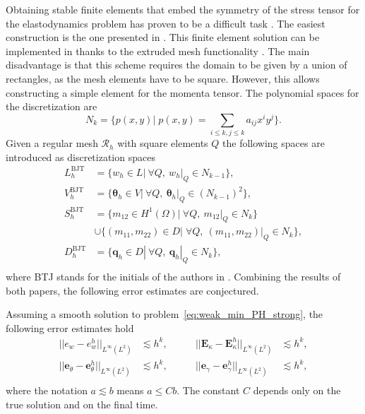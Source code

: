 Obtaining stable finite elements that embed the symmetry of the stress tensor for the elastodynamics problem has proven to be a difficult task \cite{arnold2002mixed}. The easiest construction is the one presented in \cite{becache2001elas}. This finite element solution can be implemented in {} \cite{rathgeber2017firedrake} thanks to the extruded mesh functionality \cite{mcrae2016}.  The main disadvantage is that this scheme requires the domain to be given by a union of rectangles, as the mesh elements have to be square. However, this allows constructing a simple element for the momenta tensor. The polynomial spaces for the discretization are
\[
N_{k} = \{p(x, y)| \; p(x, y) = \sum_{i\le k, j\le k} a_{ij} x^i y^j  \}.
\]
Given a regular mesh $\mathcal{R}_h$ with square elements $Q$ the following spaces are introduced as discretization spaces
\begin{equation}
\label{eq:BTJ}
\begin{aligned}
L_h^{\text{BJT}} &= \{w_h \in L | \ \forall Q, \ w_h|_{Q} \in N_{k-1} \}, \\
V_h^{\text{BJT}} &= \{\bm{\theta}_h \in V | \ \forall Q,\ \bm{\theta}_h|_{Q} \in (N_{k-1})^2 \}, \\
S_h^{\text{BJT}} &= \{m_{12} \in H^1(\Omega)| \ \forall Q,\ m_{12}|_{Q} \in N_{k} \}  \\
&\cup \{(m_{11}, m_{22}) \in D| \; \forall Q,\ (m_{11}, m_{22})|_{Q} \in N_{k} \}, \\
D_h^{\text{BJT}} &= \{\bm{q}_h \in D | \ \forall Q,\ \bm{q}_h|_{Q} \in N_{k} \}, \\ 
\end{aligned}
\end{equation}
where BTJ stands for the initials of the authors in \cite{becache2000wave,becache2001elas}. Combining the results of both papers, the following error estimates are conjectured.
\begin{conjecture}
	Assuming a smooth solution to problem~\eqref{eq:weak_min_PH_strong}, the following error estimates hold 
	\begin{equation}
	\label{eq:errBEC}
	\begin{aligned}
	||e_w - e_w^h||_{L^{\infty}(L^2)} &\lesssim h^{k}, \\
	||\bm{e}_\theta - \bm{e}_\theta^h||_{L^{\infty}(L^2)} &\lesssim h^{k}, \\
	\end{aligned} \qquad
	\begin{aligned}
	||\bm{E}_\kappa - \bm{E}_\kappa^h||_{L^{\infty}(L^2)} &\lesssim  h^{k}, \\
	||\bm{e}_\gamma - \bm{e}_\gamma^ h||_{L^{\infty}(L^2)} &\lesssim  h^{k}, \\
	\end{aligned} 
	\end{equation}
	where the notation $a \lesssim  b$ means $a \le C b$. The constant $C$ depends only on the true solution and on the final time.
\end{conjecture}


